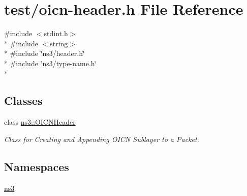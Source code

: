 \hypertarget{test_2oicn-header_8h}{\section{test/oicn-\/header.h File Reference}
\label{test_2oicn-header_8h}
}
{\ttfamily \#include $<$stdint.\-h$>$}\\*
{\ttfamily \#include $<$string$>$}\\*
{\ttfamily \#include \char`\"{}ns3/header.\-h\char`\"{}}\\*
{\ttfamily \#include \char`\"{}ns3/type-\/name.\-h\char`\"{}}\\*
\subsection*{Classes}
\begin{DoxyCompactItemize}
\item 
class \hyperlink{classns3_1_1OICNHeader}{ns3\-::\-O\-I\-C\-N\-Header}
\begin{DoxyCompactList}\small\item\em Class for Creating and Appending O\-I\-C\-N Sublayer to a Packet. \end{DoxyCompactList}\end{DoxyCompactItemize}
\subsection*{Namespaces}
\begin{DoxyCompactItemize}
\item 
\hyperlink{namespacens3}{ns3}
\end{DoxyCompactItemize}
